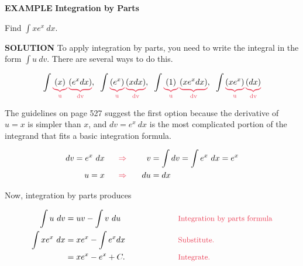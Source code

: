 \documentclass[12pt]{article}
\begin{document}
\bigskip

\noindent \color{myblue} \large \textbf{EXAMPLE} \color{black} \normalsize \textbf{Integration by Parts}
\rmfamily

\bigskip

\noindent Find $ \displaystyle \int xe^x \ dx$.
\sffamily

\bigskip

\noindent \color{myblue} \textbf{SOLUTION} \color{black} \rmfamily \hspace{.3cm}To apply integration by parts, you need to write the integral in the form $\int u \ dv$. There are several ways to do this.

$$ \int \color{mypink}\underbrace{\color{black}(x)}_\text{u} \color{mypink}\underbrace{\color{black}(e^x dx)}_\text{dv}\color{black}, 
\hspace{.2cm} \int \color{mypink}\underbrace{\color{black}(e^x)}_\text{u} \color{mypink}\underbrace{\color{black}(x dx)}_\text{dv}\color{black}, 
\hspace{.2cm}  \int \color{mypink}\underbrace{\color{black}(1)}_\text{u} \color{mypink}\underbrace{\color{black}(xe^x dx)}_\text{dv}\color{black}, 
\hspace{.2cm} \int \color{mypink}\underbrace{\color{black}(x e^x)}_\text{u} \color{mypink}\underbrace{\color{black}(dx)}_\text{dv} $$

\noindent The guidelines on page 527 suggest the first option because the derivative of $u = x$ is simpler than $x$, and $dv = e^x \ dx$ is the most complicated portion of the integrand that fits a basic integration formula. 


\begin{alignat*}{3}
dv = e^x \ dx \hspace{.5cm}  &\color{mypink}\Rightarrow \color{black}&v &= \int dv = \int e^x \ dx = e^x\\
u = x \hspace{.5cm} &\color{mypink}\Rightarrow \color{black}& \hspace{.3cm}du &= dx
\end{alignat*}

\noindent Now, integration by parts produces

\begin{align*}
\int u \ dv &= uv - \int v \ du \ \hspace{2cm} &&\text{\color{mypink}\small Integration by parts formula}\\
 \int xe^x \ dx &= xe^x - \int e^x  dx &&\text{\color{mypink}\small Substitute.}\\
 &= xe^x - e^x + C. &&\text{\color{mypink}\small Integrate.}
\end{align*}
\end{document}
